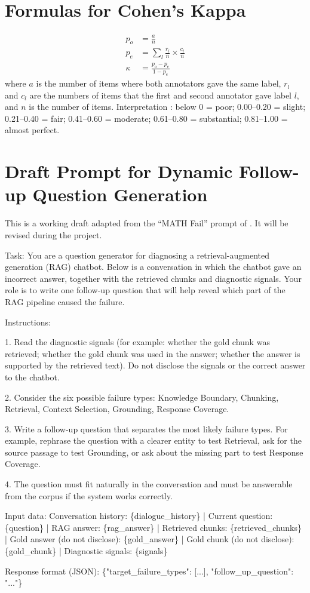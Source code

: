 \documentclass[11pt]{article}
\begin{document}
\section{Formulas for Cohen's Kappa}
\label{app:kappa}
\begin{align}
p_o &= \frac{a}{n} \\
p_e &= \sum_{l} \frac{r_l}{n} \times \frac{c_l}{n} \\
\kappa &= \frac{p_o - p_e}{1 - p_e}
\end{align}
where $a$ is the number of items where both annotators gave the same label, $r_l$ and $c_l$ are the numbers of items that the first and second annotator gave label $l$, and $n$ is the number of items. Interpretation \citep{landis1977}: below 0 = poor; 0.00--0.20 = slight; 0.21--0.40 = fair; 0.41--0.60 = moderate; 0.61--0.80 = substantial; 0.81--1.00 = almost perfect.

\section{Draft Prompt for Dynamic Follow-up Question Generation}
\label{app:prompt}
This is a working draft adapted from the ``MATH Fail'' prompt of \citet{kim2024interviewer}. It will be revised during the project.

{\small\ttfamily\raggedright
Task: You are a question generator for diagnosing a retrieval-augmented generation (RAG) chatbot. Below is a conversation in which the chatbot gave an incorrect answer, together with the retrieved chunks and diagnostic signals. Your role is to write one follow-up question that will help reveal which part of the RAG pipeline caused the failure.\par\medskip
Instructions:\par
1. Read the diagnostic signals (for example: whether the gold chunk was retrieved; whether the gold chunk was used in the answer; whether the answer is supported by the retrieved text). Do not disclose the signals or the correct answer to the chatbot.\par
2. Consider the six possible failure types: Knowledge Boundary, Chunking, Retrieval, Context Selection, Grounding, Response Coverage.\par
3. Write a follow-up question that separates the most likely failure types. For example, rephrase the question with a clearer entity to test Retrieval, ask for the source passage to test Grounding, or ask about the missing part to test Response Coverage.\par
4. The question must fit naturally in the conversation and must be answerable from the corpus if the system works correctly.\par\medskip
Input data: Conversation history: \{dialogue\_history\} | Current question: \{question\} | RAG answer: \{rag\_answer\} | Retrieved chunks: \{retrieved\_chunks\} | Gold answer (do not disclose): \{gold\_answer\} | Gold chunk (do not disclose): \{gold\_chunk\} | Diagnostic signals: \{signals\}\par\medskip
Response format (JSON): \{"target\_failure\_types": [...], "follow\_up\_question": "..."\}\par
}
\end{document}
